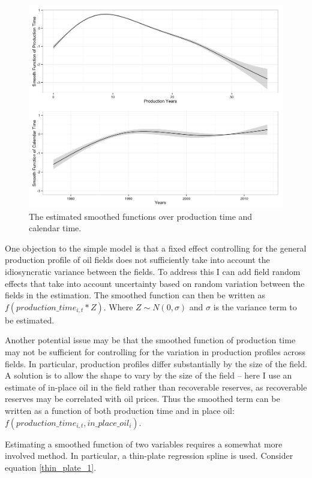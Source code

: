 \documentclass[12pt]{article}
\begin{document}
\begin{figure}
	\includegraphics[width=1\textwidth]{figures/smooths.png}
	\caption{The estimated smoothed functions over production time and calendar time.}
	\label{smooths}
\end{figure}

One objection to the simple model is that a fixed effect controlling for the general production profile of oil fields does not sufficiently take into account the idiosyncratic variance between the fields. To address this I can add field random effects that take into account uncertainty based on random variation between the fields in the estimation. The smoothed function can then be written as $f(production\_time_{i,t}*Z)$.  Where $Z \sim N(0, \sigma)$ and $\sigma$ is the variance term to be estimated.  

Another potential issue may be that the smoothed function of production time may not be sufficient for controlling for the variation in production profiles across fields.  In particular, production profiles differ substantially by the size of the field. A solution is to allow the shape to vary by the size of the field -- here I use an estimate of in-place oil in the field rather than recoverable reserves, as recoverable reserves may be correlated with oil prices.  Thus the smoothed term can be written as a function of both production time and in place oil: $f(production\_time_{i,t}, in\_place\_oil_{i})$.

Estimating a smoothed function of two variables requires a somewhat more involved method.  In particular, a thin-plate regression spline \citep{wood_thin_2003} is used. Consider equation \ref{thin_plate_1}. 
\end{document}
